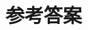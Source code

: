 \documentclass[10pt,twoside,fleqn]{ctexart}
\begin{document}




















\newpage
\showanswers
\section*{参考答案}
\begin{enumerate}
\foreachdataset{\thisdataset}{%
\foreachproblem[\thisdataset]{\item[\ref{prob:\thisproblemlabel}]\thisproblem}}
\end{enumerate}





\end{document}
